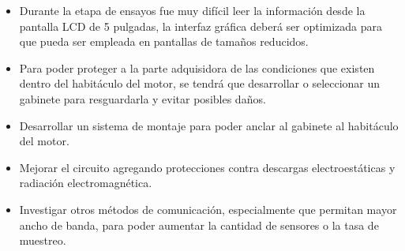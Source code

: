 \begin{itemize}
\item Durante la etapa de ensayos fue muy difícil leer la información desde la pantalla LCD de 5 pulgadas, la interfaz gráfica deberá ser optimizada para que pueda ser empleada en pantallas de tamaños reducidos.

\item Para poder proteger a la parte adquisidora de las condiciones que existen dentro del habitáculo del motor, se tendrá que desarrollar o seleccionar un gabinete para resguardarla y evitar posibles daños.

\item Desarrollar un sistema de montaje para poder anclar al gabinete al habitáculo del motor.

\item Mejorar el circuito agregando protecciones contra descargas electroestáticas y radiación electromagnética.

\item Investigar otros métodos de comunicación, especialmente que permitan mayor ancho de banda, para poder aumentar la cantidad de sensores o la tasa de muestreo.

\end{itemize}



